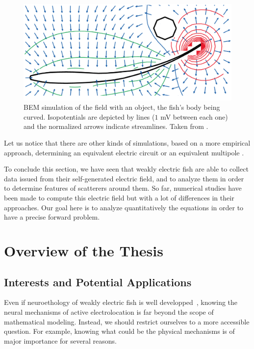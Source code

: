 \begin{figure}
\centering
\includegraphics[width=\textwidth]{intro/figures/BEM_Assad}
\caption{BEM simulation of the field with an object, the fish's body being
curved. Isopotentials are depicted by lines ($1$ mV between each
one) and the normalized arrows indicate streamlines. Taken from \cite{assad1998electric}.
\label{fig:simulation_bem_assad}}
\end{figure}


Let us notice that there are other kinds of simulations, based on a
more empirical approach, determining an equivalent electric circuit
\cite{budelli2000electric,caputi1998electric} or an equivalent multipole
\cite{chen2005modeling}.

To conclude this section, we have seen that weakly electric fish are
able to collect data issued from their self-generated electric field,
and to analyze them in order to determine features of scatterers around
them. So far, numerical studies have been made to compute this electric
field but with a lot of differences in their approaches. Our goal
here is to analyze quantitatively the equations in order to have a
precise forward problem.


\section{Overview of the Thesis}

\label{sec:overview}

\subsection{Interests and Potential Applications}

Even if neuroethology of weakly electric fish is well developped~\cite{neuro},
knowing the neural mechanisms of active electrolocation is far beyond the scope
of mathematical modeling. Instead, we should restrict ourselves to a more accessible question. 
For example, knowing what could be the physical mechanisms is of major importance for several
reasons.

